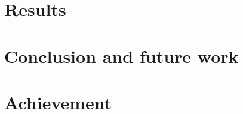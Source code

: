 \documentclass[11pt]{article}
\begin{document}
\section{Results\label{sec:results}}

\section{Conclusion and future work\label{sec:conclusion_future_work}}

\section{Achievement}




\end{document}

